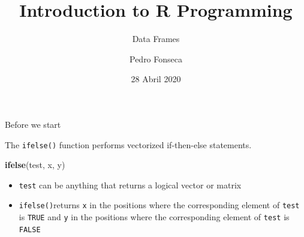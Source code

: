 \documentclass[ignorenonframetext,]{beamer}
\title{Introduction to R Programming}
\subtitle{Data Frames}
\author{Pedro Fonseca}
\date{28 Abril 2020}
\newenvironment{Shaded}{\begin{snugshade}}{\end{snugshade}}
\newcommand{\KeywordTok}[1]{\textcolor[rgb]{0.13,0.29,0.53}{\textbf{#1}}}
\newcommand{\NormalTok}[1]{#1}
\begin{document}
\frame{\titlepage}

\begin{frame}[fragile]{Before we start}
\protect\hypertarget{before-we-start}{}

The \texttt{ifelse()} function performs vectorized if-then-else
statements.

\begin{Shaded}
\begin{Highlighting}[]
\KeywordTok{ifelse}\NormalTok{(test, x, y)}
\end{Highlighting}
\end{Shaded}

\begin{itemize}
\item
  \texttt{test} can be anything that returns a logical vector or matrix
\item
  \texttt{ifelse()}returns \texttt{x} in the positions where the
  corresponding element of \texttt{test} is \texttt{TRUE} and \texttt{y}
  in the positions where the corresponding element of \texttt{test} is
  \texttt{FALSE}
\end{itemize}

\end{frame}
\end{document}
